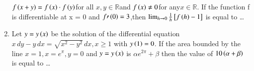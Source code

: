 \documentclass[journal,12pt,twocolumn]{IEEEtran}
\theoremstyle{remark}
\begin{document}
\begin{enumerate}[start=16]
$
f\left(x + y\right) = f\left(x\right) \cdot f\left(y\right)$for all $x, y \in \mathbb{R} $and $ f\left(x\right) \neq 0 $for any$ x \in \mathbb{R}
$. If the function f is differentiable at x = 0 and $f\prime\left(0\right)=3$,then $
\lim_{h \to 0} \frac{1}{h}  {}\left[f\left(h\right) - 1 \right]$ is equal to \dots
\hfill{}
\item Let $y = y \left(x\right)$ be the solution of the differential equation $x \, dy - y \, dx = \sqrt{x^2 - y^2} \, dx, x \geq 1
$ with $y\left(1\right)=0$. If the area bounded by the line $x = 1, x = e^\pi, y = 0$ and $y = y\left(x\right)$ is $ \alpha e^{2\pi} + \beta $ then the value of $10 \left(\alpha + \beta\right)$ is equal to \dots
\hfill{}






\end{enumerate}
\end{document}
